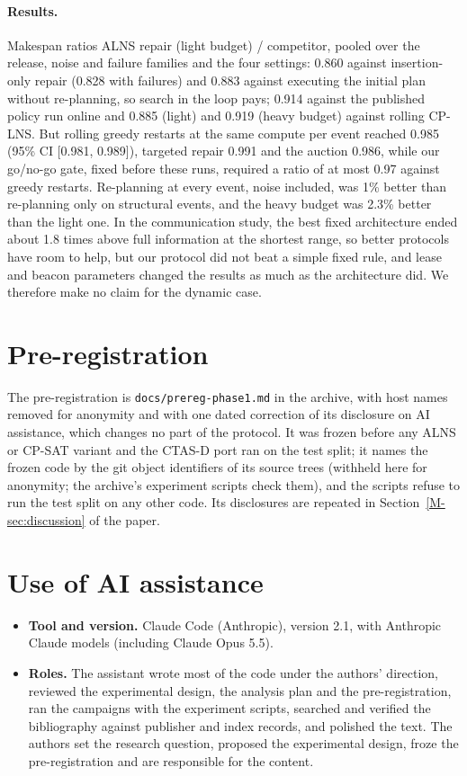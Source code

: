 \documentclass[10pt]{article}
\begin{document}
\paragraph{Results.} Makespan ratios ALNS repair (light budget) / competitor, pooled over the release, noise and failure
families and the four settings: 0.860 against insertion-only repair (0.828 with failures) and 0.883 against executing
the initial plan without re-planning, so search in the loop pays; 0.914 against the published policy run online and
0.885 (light) and 0.919 (heavy budget) against rolling CP-LNS. But rolling greedy restarts at the same compute per event
reached 0.985 (95\% CI [0.981, 0.989]), targeted repair 0.991 and the auction 0.986, while our go/no-go gate, fixed
before these runs, required a ratio of at most 0.97 against greedy restarts. Re-planning at every event, noise
included, was 1\% better than re-planning only on structural events, and the heavy budget was 2.3\% better than the
light one. In the communication study, the best fixed architecture ended about 1.8 times above full information at the
shortest range, so better protocols have room to help, but our protocol did not beat a simple fixed rule, and lease
and beacon parameters changed the results as much as the architecture did. We therefore make no claim for the dynamic
case.

\section{Pre-registration}
\label{sec:s-prereg}

The pre-registration is \texttt{docs/prereg-phase1.md} in the archive, with host names removed for anonymity and
with one dated correction of its disclosure on AI assistance, which changes no part of the protocol. It was
frozen before any ALNS or CP-SAT variant and the CTAS-D port ran on the test split; it names the frozen code by the git
object identifiers of its source trees (withheld here for anonymity; the archive's experiment scripts check them),
and the scripts refuse to run the test split on any other code. Its disclosures are repeated in Section~\ref{M-sec:discussion}
of the paper.

\section{Use of AI assistance}
\label{sec:s-ai}

\begin{itemize}
\item \textbf{Tool and version.} Claude Code (Anthropic), version 2.1, with Anthropic Claude models (including Claude
  Opus 5.5).
\item \textbf{Roles.} The assistant wrote most of the code under the authors' direction, reviewed the experimental
  design, the analysis plan and the pre-registration, ran the campaigns with the experiment scripts, searched and verified the
  bibliography against publisher and index records, and polished the text. The authors set the research question,
  proposed the experimental design, froze the pre-registration and are responsible for the content.
\end{itemize}



\end{document}
